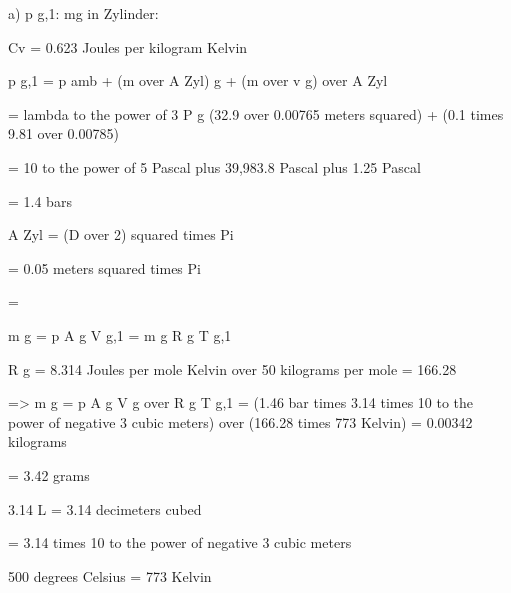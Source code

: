 a) p g,1: mg in Zylinder:

Cv = 0.623 Joules per kilogram Kelvin

p g,1 = p amb + (m over A Zyl) g + (m over v g) over A Zyl

= lambda to the power of 3 P g (32.9 over 0.00765 meters squared) + (0.1 times 9.81 over 0.00785)

= 10 to the power of 5 Pascal plus 39,983.8 Pascal plus 1.25 Pascal

= 1.4 bars

A Zyl = (D over 2) squared times Pi

= 0.05 meters squared times Pi

=

m g = p A g V g,1 = m g R g T g,1

R g = 8.314 Joules per mole Kelvin over 50 kilograms per mole = 166.28

=> m g = p A g V g over R g T g,1 = (1.46 bar times 3.14 times 10 to the power of negative 3 cubic meters) over (166.28 times 773 Kelvin) = 0.00342 kilograms

= 3.42 grams

3.14 L = 3.14 decimeters cubed

= 3.14 times 10 to the power of negative 3 cubic meters

500 degrees Celsius = 773 Kelvin